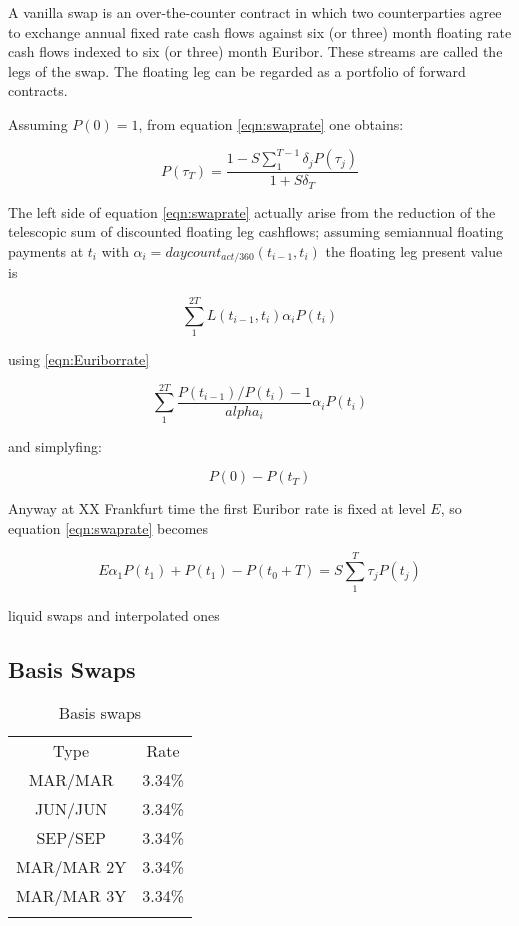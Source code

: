\documentclass[11pt,reqno]{amsart}
\begin{document}
A vanilla swap is an over-the-counter contract
in which two counterparties agree to exchange annual fixed rate cash
flows against six (or three) month floating rate cash flows indexed to six (or three)
month Euribor. These streams are called the legs of the swap.
The floating leg can be regarded as a portfolio of forward contracts.

Assuming $P(0)=1$, from equation \ref{eqn:swaprate} one obtains:

\begin{equation}
P(\tau_T) = \frac
    {1 - S \sum_1^{T-1} \delta_j P(\tau_j)}
    {1+S \delta_T}
\label{eqn:discfromswaprate}
\end{equation}

The left side of equation \ref{eqn:swaprate} actually arise from
the reduction of the telescopic sum of discounted floating leg cashflows;
assuming semiannual floating payments at $t_i$ with
$\alpha_i=daycount_{act/360}(t_{i-1},t_i) $ the floating leg
present value is

\begin{equation}
\sum_1^{2T} L(t_{i-1},t_i) \alpha_i P(t_i)
\label{eqn:discfloatlegcf}
\end{equation}

using \ref{eqn:Euriborrate}

\begin{equation}
\sum_1^{2T} \frac{P(t_{i-1}) / P(t_i) - 1}{alpha_i} \alpha_i P(t_i)
\end{equation}

and simplyfing:

\begin{equation}
P(0)-P(t_T)
\end{equation}

Anyway at XX Frankfurt time the first Euribor rate is fixed at level $E$, so
equation \ref{eqn:swaprate} becomes

\begin{equation}
E \alpha_1 P(t_1) + P(t_1) - P(t_0+T) = S \sum_1^T \tau_j P(t_j)
\label{eqn:swapratewithfixingeffect}
\end{equation}


liquid swaps and interpolated ones


\subsection{Basis Swaps}

\begin{table}[tbp]
\label{tab:basisSwaps}
\begin{tabular}{cc}
Type & Rate \\
MAR/MAR & 3.34\% \\
JUN/JUN & 3.34\% \\
SEP/SEP & 3.34\% \\
MAR/MAR 2Y & 3.34\% \\
MAR/MAR 3Y & 3.34\% \\
&
\end{tabular}%
\caption{Basis swaps}
\end{table}
\end{document}
